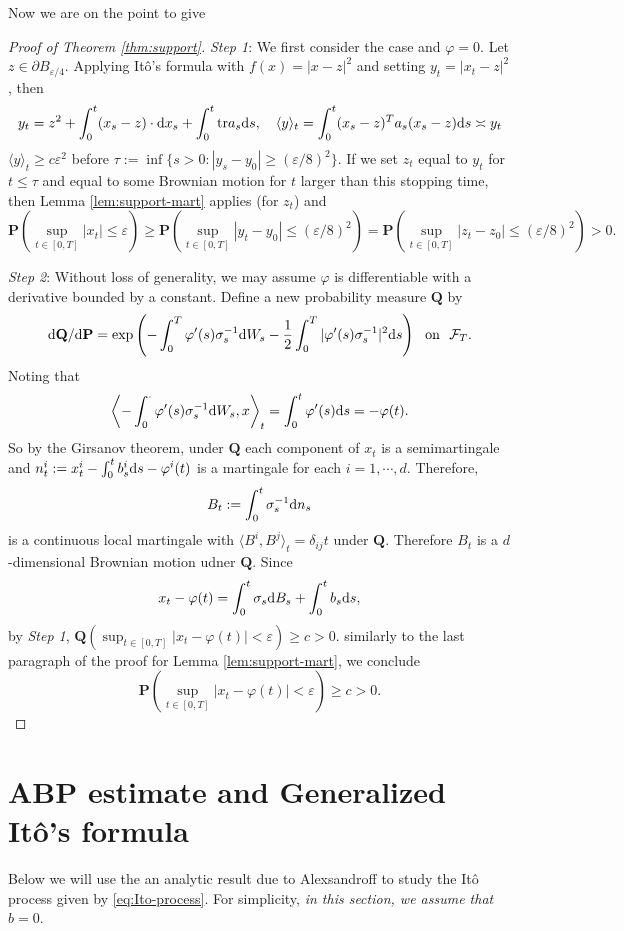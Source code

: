 \documentclass[twoside, 12pt]{book}
\numberwithin{equation}{chapter}
\def\cF{{\mathcal F}}
\def\bP{{\mathbf P}}
\def\bQ{{\mathbf Q}}
\def\l{\left}
\def\r{\right}
\def\<{\langle}
\def\>{\rangle}
\def\geq{\geqslant}
\def\leq{\leqslant}
\def\p{\partial}
\def\d{\text{\rm{d}}}
\def\eps{\varepsilon}
\begin{document}
	Now we are on the point to give 
	\begin{proof}[Proof of Theorem \ref{thm:support}]	    	
		{\em Step 1}: We first consider the case  and $\varphi = 0$. 
		Let $z\in \p B_{\eps/4}$. Applying It\^o's formula with $f(x)=|x-z|^2$ and setting $y_t= |x_t-z|^2$, then 
		\[
		y_t=z^2+ \int_0^t (x_s-z)\cdot \d x_s+ \int_0^t \mathrm{tr} a_s \d s, \quad \<y\>_t= \int_0^t (x_s-z)^T a_s (x_s-z) \d s\asymp y_t
		\]	    	
		$\<y\>_t \geq c \eps^2$ before $\tau:= \inf\{s>0: |y_s-y_0|\geq (\eps/8)^2\}$. If we set $z_t$  equal to $y_t$ for $t\leq\tau$ and equal to some Brownian motion for $t$ larger than this stopping time, then Lemma \ref{lem:support-mart} applies (for $z_t$) and
		\[
		\bP \l( \sup_{t\in [0,T]} |x_t|\leq \eps \r) \geq \bP \l( \sup_{t\in [0,T]} |y_t-y_0| \leq( \eps/8 )^2\r)= \bP \l( \sup_{t\in [0,T]} |z_t-z_0| \leq (\eps/8)^2 \r)> 0. 
		\]
		
		{\em Step 2}: Without loss of generality, we may assume $\varphi$ is differentiable with a derivative bounded by a constant. Define a new probability measure $\bQ$ by
		\[
		\d \bQ/\d \bP = \exp\l( -\int_0^T \varphi'(s) \sigma^{-1}_s \d W_s- \frac{1}{2}\int_0^T |\varphi'(s) \sigma^{-1}_s|^2 \d s \r) ~ \mbox{ on }~ \cF_T. 
		\]
		Noting that 
		\[
		\l\<-\int_0^\cdot \varphi'(s) \sigma^{-1}_s \d W_s, x\r\>_t = \int_0^t \varphi'(s) \d s = - \varphi(t). 
		\]
		So by the Girsanov theorem, under $\bQ$ each component of $x_t$ is a semimartingale and $n^i_t:=x_t^i - \int_0^t b_s^i \d s - \varphi^i(t)$ is a martingale for each $i=1,\cdots, d$. Therefore, 
		\[
		B_t:= \int_0^t \sigma^{-1}_s \d n_s 
		\]
		is a continuous local martingale with $\<B^i, B^j\>_t= \delta_{ij}t$ under $\bQ$. Therefore $B_t$ is a $d$-dimensional Brownian motion udner $\bQ$. Since 
		\[
		x_t- \varphi(t)= \int_0^t \sigma_s \d B_s+ \int_0^t b_s\d s, 
		\]
		by {\em Step 1}, $\bQ(\sup_{t\in [0,T]}|x_t-\varphi(t)|<\eps)\geq c>0$. similarly to the last paragraph of the proof for Lemma \ref{lem:support-mart}, we conclude
		\[
		\bP \l(\sup_{t\in [0,T]}|x_t-\varphi(t)|<\eps\r)\geq c>0. 
		\]
		
	\end{proof}
	
	
	\section{ABP estimate and Generalized It\^o's formula}

    Below we will use the an analytic result due to Alexsandroff to study the It\^o process given by \eqref{eq:Ito-process}. 
    For simplicity,  {\em in this section, we assume that $b=0$}. 
\end{document}
